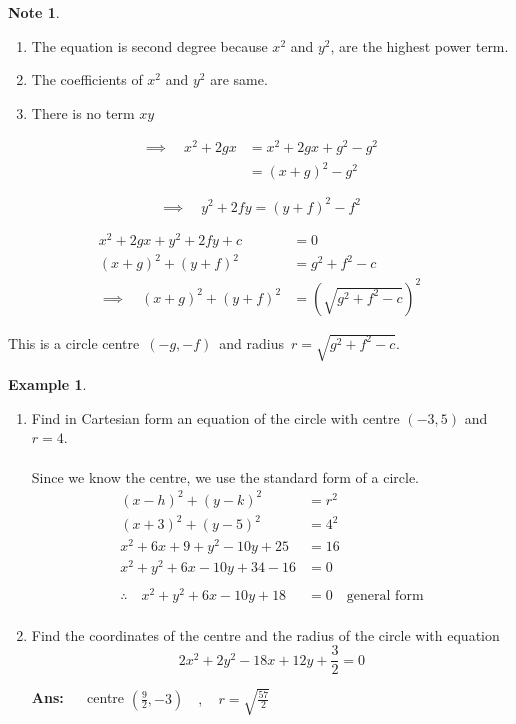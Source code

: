\documentclass[11pt,a4paper]{article}
\theoremstyle{definition}
\newtheorem{example}[thm]{Example}
\newtheorem{note}[thm]{Note}
\begin{document}
\begin{note}

\begin{enumerate}
\item The equation is second degree because $x^2$ and $y^2$, are the highest power term.
\item The coefficients of $x^2$ and $y^2$ are same.
\item There is no term $xy$
\end{enumerate}




\begin{align*}
\implies\quad  x^2 + 2gx & = x^2 + 2gx + g^2 - g^2\\
& = \left(x + g\right)^2 - g^2
\end{align*}


$$\implies\quad  y^2 + 2fy = \left(y + f\right)^2 - f^2$$


\begin{align*}
x^2 + 2gx + y^2 + 2fy + c &  = 0\\
\left(x + g\right)^2 + \left(y + f\right)^2 & = g^2 + f^2 - c\\
\implies\quad  \left(x + g\right)^2 + \left(y + f\right)^2 & = \left( \sqrt{g^2 + f^2 - c}\right)^2
\end{align*}


This is a circle centre $\, (-g,-f)\,$ and radius $\, r = \sqrt{g^2 + f^2 - c}$.
\end{note}
\begin{example}

\begin{enumerate}
\item Find in Cartesian form an equation of the circle with centre $(-3,5)$ and $r  = 4$.\\

\underline{}\\
Since we know the centre, we use the standard form of a circle.
\begin{align*}
(x - h)^2 + (y - k)^2 & = r^2\\
(x + 3)^2 + (y - 5)^2 & = 4^2\\
x^2 + 6x + 9 + y^2 - 10y + 25 & = 16\\
x^2 + y^2 + 6x  - 10y + 34 - 16 & = 0\\\\
\therefore\quad  x^2 + y^2 +6x - 10y + 18 & = 0\quad  \text{general form}\\
\end{align*}



\item Find the coordinates of the centre and the radius of the circle with equation $$2x^2 + 2y^2 - 18x + 12y + \frac{3}{2} = 0$$

\textbf{Ans:} $\quad $ centre $\left(\frac{9}{2}, -3\right)\quad , \quad  r = \sqrt{\frac{57}{2}}$\\\\
\end{enumerate}
\end{example}
\end{document}
